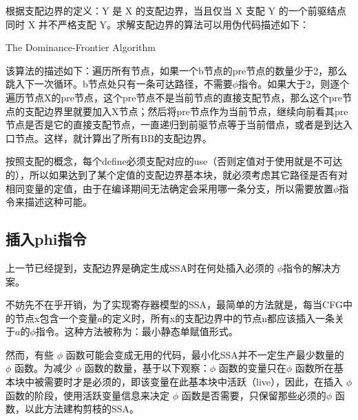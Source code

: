 根据支配边界的定义：Y 是 X 的支配边界，当且仅当 X 支配 Y 的一个前驱结点同时 X 并不严格支配 Y。求解支配边界的算法可以用伪代码描述如下\cite{10.1145/115372.115320}：

\begin{algorithm}[htb]
  \small
  \SetAlgoLined
  \caption{The Dominance-Frontier Algorithm}
  \label{algo:domfrontier}
\end{algorithm}

该算法的描述如下：遍历所有节点，如果一个b节点的pre节点的数量少于2，那么跳入下一次循环。b节点处只有一条可达路径，不需要$\phi$指令。如果大于2，则逐个遍历节点X的pre节点，这个pre节点不是当前节点的直接支配节点，那么这个pre节点的支配边界里就要加入X节点；然后将pre节点作为当前节点，继续向前看其pre节点是否是它的直接支配节点，一直递归到前驱节点等于当前借点，或者是到达入口节点。这样，就计算出了所有BB的支配边界。

按照支配的概念，每个define必须支配对应的use（否则定值对于使用就是不可达的），所以如果达到了某个定值的支配边界基本块，就必须考虑其它路径是否有对相同变量的定值，由于在编译期间无法确定会采用哪一条分支，所以需要放置$\phi$指令来描述这种可能。


\subsection{插入phi指令}

上一节已经提到，支配边界是确定生成SSA时在何处插入必须的 $\phi$指令的解决方案。

不妨先不在乎开销，为了实现寄存器模型的SSA，最简单的方法就是，每当CFG中的节点x包含一个变量$a$的定义时，所有x的支配边界中的节点n都应该插入一条关于$a$的$\phi$指令。这种方法被称为：最小静态单赋值形式。

然而，有些 $\phi$ 函数可能会变成无用的代码，最小化SSA并不一定生产最少数量的 $\phi$ 函数。为减少 $\phi$ 函数的数量，基于以下观察：$\phi$ 函数的变量只在$\phi$ 函数所在基本块中被需要时才是必须的，即该变量在此基本块中活跃（live），因此，在插入 $\phi$ 函数的阶段，使用活跃变量信息来决定 $\phi$ 函数是否需要，只保留那些必须的$\phi$ 函数，以此方法建构剪枝的SSA。

